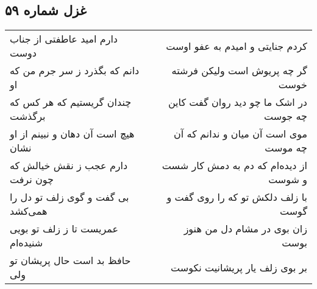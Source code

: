 \begin{center}
\section*{غزل شماره ۵۹}
\label{sec:sh059}
\begin{longtable}{l p{0.5cm} r}
دارم امید عاطفتی از جناب دوست
&&
کردم جنایتی و امیدم به عفو اوست
\\
دانم که بگذرد ز سر جرم من که او
&&
گر چه پریوش است ولیکن فرشته خوست
\\
چندان گریستیم که هر کس که برگذشت
&&
در اشک ما چو دید روان گفت کاین چه جوست
\\
هیچ است آن دهان و نبینم از او نشان
&&
موی است آن میان و ندانم که آن چه موست
\\
دارم عجب ز نقش خیالش که چون نرفت
&&
از دیده‌ام که دم به دمش کار شست و شوست
\\
بی گفت و گوی زلف تو دل را همی‌کشد
&&
با زلف دلکش تو که را روی گفت و گوست
\\
عمریست تا ز زلف تو بویی شنیده‌ام
&&
زان بوی در مشام دل من هنوز بوست
\\
حافظ بد است حال پریشان تو ولی
&&
بر بوی زلف یار پریشانیت نکوست
\\
\end{longtable}
\end{center}
